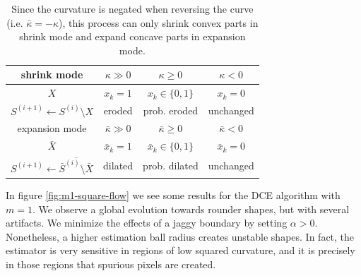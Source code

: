 \documentclass[smallextended]{svjour3}       %
\begin{document}
\begin{table}
  \center
  \begin{tabular}{|c|c|c|c|} \hline
    shrink mode &    $\kappa \gg 0$ & $\kappa \geq 0$ &  $\kappa < 0$ \\ \hline
    $X$ & $x_k=1$ & $x_k \in \{0,1\}$ & $x_k=0$ \\ \hline
    $S^{(i+1)} \leftarrow S^{(i)} \setminus X$ & eroded & prob. eroded & unchanged  \\ \hline \hline
    expansion mode &    $\bar{\kappa} \gg 0$ & $\bar{\kappa} \geq 0$ & $\bar{\kappa} < 0$ \\ \hline
    $\bar{X}$ & $\bar{x}_k=1$ & $\bar{x}_k \in \{0,1\}$ & $\bar{x}_k=0$ \\ \hline
    $S^{(i+1)} \leftarrow \overline{\bar{S}^{(i)} \setminus \bar{X}}$ & dilated & prob. dilated & unchanged \\ \hline 
  \end{tabular}
  
  \caption{  Since the curvature is negated when reversing the curve (i.e. $\bar{\kappa}=-\kappa$), this process can only shrink  convex parts in shrink mode and expand concave parts in expansion mode.}
   \label{tab:flow-summary}	  

\end{table}


In figure \ref{fig:m1-square-flow} we see some results for the DCE algorithm with $m=1$. We observe a global evolution
towards rounder shapes, but with several artifacts. We minimize the effects of a jaggy boundary by setting $\alpha >
0$. Nonetheless, a higher estimation ball radius creates unstable shapes. In fact, the estimator is very sensitive in
regions of low squared curvature, and it is precisely in those regions that spurious pixels are created.
\end{document}
